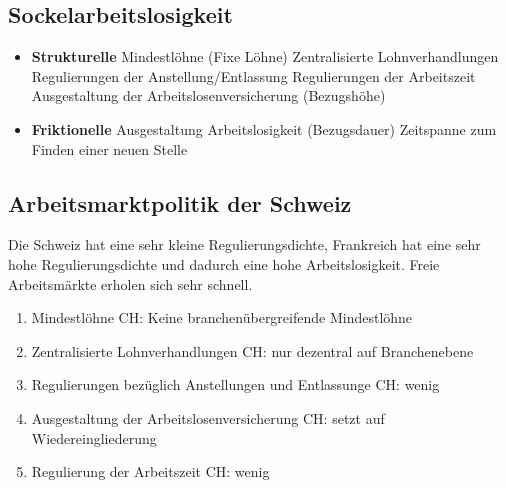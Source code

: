 	\subsection{Sockelarbeitslosigkeit}
	\begin{itemize}
		\item \textbf{Strukturelle}
		\subitem Mindestlöhne (Fixe Löhne)
		\subitem Zentralisierte Lohnverhandlungen
		\subitem Regulierungen der Anstellung/Entlassung
		\subitem Regulierungen der Arbeitszeit
		\subitem Ausgestaltung der Arbeitslosenversicherung (Bezugshöhe)
		\item \textbf{Friktionelle}
		\subitem Ausgestaltung Arbeitslosigkeit (Bezugsdauer)
		\subitem Zeitspanne zum Finden einer neuen Stelle
	\end{itemize}

	\subsection{Arbeitsmarktpolitik der Schweiz}
	Die Schweiz hat eine sehr kleine Regulierungsdichte, Frankreich hat eine sehr hohe Regulierungsdichte und dadurch eine hohe Arbeitslosigkeit. Freie Arbeitsmärkte erholen sich sehr schnell. 
	\begin{enumerate}
		\item Mindestlöhne
		\subitem CH: Keine branchenübergreifende Mindestlöhne
		\item Zentralisierte Lohnverhandlungen
		\subitem CH: nur dezentral auf Branchenebene
		\item Regulierungen bezüglich Anstellungen und Entlassunge
		\subitem CH: wenig
		\item Ausgestaltung der Arbeitslosenversicherung
		\subitem CH: setzt auf Wiedereingliederung
		\item Regulierung der Arbeitszeit
		\subitem CH: wenig
	\end{enumerate}
\clearpage
\pagebreak


